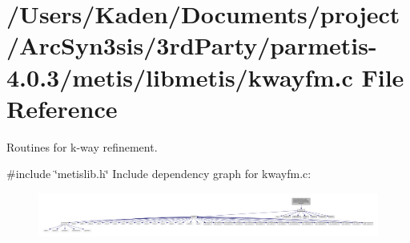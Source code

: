 \hypertarget{a00221}{}\section{/\+Users/\+Kaden/\+Documents/project/\+Arc\+Syn3sis/3rd\+Party/parmetis-\/4.0.3/metis/libmetis/kwayfm.c File Reference}
\label{a00221}


Routines for k-\/way refinement.  


{\ttfamily \#include \char`\"{}metislib.\+h\char`\"{}}\newline
Include dependency graph for kwayfm.\+c\+:\nopagebreak
\begin{figure}[H]
\begin{center}
\leavevmode
\includegraphics[width=350pt]{a00222}
\end{center}
\end{figure}
